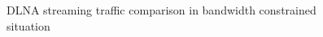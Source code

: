 \begin{figure}[hb]%
\caption{DLNA streaming traffic comparison in
bandwidth constrained situation\label{dlna_traffic_bw}}
\end{figure}
